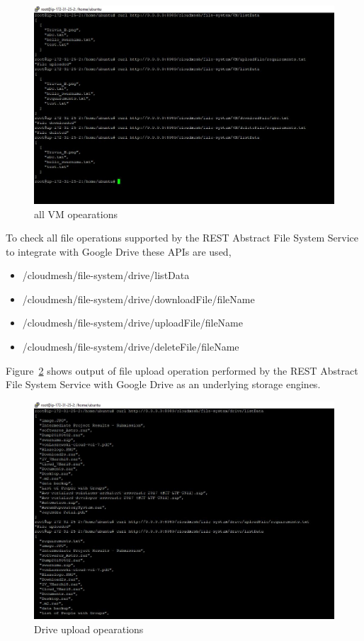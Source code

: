 \begin{figure}[!ht]
        \centering\includegraphics[width=\columnwidth]
        {image/VM.JPG}
        \caption{all VM opearations}\label{fig:VM}
\end{figure}


To check all file operations supported by the REST Abstract File
System Service to integrate with Google Drive these APIs are used,

\begin{itemize}

    \item /cloudmesh/file-system/drive/listData
    \item /cloudmesh/file-system/drive/downloadFile/{fileName}
    \item /cloudmesh/file-system/drive/uploadFile/{fileName}
    \item /cloudmesh/file-system/drive/deleteFile/{fileName}

\end{itemize}

Figure~\ref{fig:drive-upload} shows output of file upload operation
performed by the REST Abstract File System Service with Google Drive
as an underlying storage engines.

\begin{figure}[!ht]
        \centering\includegraphics[width=\columnwidth]
        {image/drive-upload.JPG}
        \caption{Drive upload opearations}\label{fig:drive-upload}
\end{figure}


